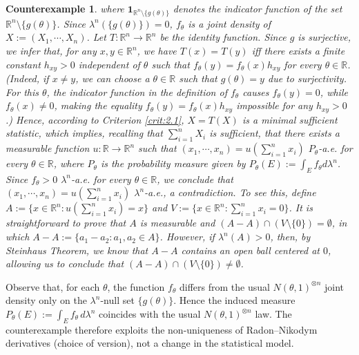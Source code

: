 \documentclass[12pt]{article}
\newtheorem{counterexample}{Counterexample}[section]
\begin{document}
\begin{counterexample}
where $\mathbf{1}_{\mathbb{R}^n\setminus \{g(\theta )\}}$ denotes the indicator function of the set $\mathbb{R}^n\setminus \{g(\theta )\}$. Since $\lambda^n(\{g(\theta )\})=0$, $f_\theta $ is a joint density of $X:=(X_1,\cdots, X_n)$. Let $T:\mathbb{R}^n\to \mathbb{R}^n$ be the identity function. Since $g$ is surjective, we infer that, for any $x,y\in\mathbb{R}^n$, we have $T(x)=T(y)$ iff there exists a finite constant $h_{xy}>0$ independent of $\theta$ such that $f_\theta (y)=f_\theta (x)h_{xy}$ for every $\theta\in\mathbb{R}$. (Indeed, if $x\neq y$, we can choose a $\theta\in\mathbb{R}$ such that $g(\theta )=y$ due to surjectivity. For this $\theta$, the indicator function in the definition of $f_\theta$ causes $f_\theta (y)=0$, while $f_\theta (x)\neq 0$, making the equality $f_\theta (y)=f_\theta (x)h_{xy}$ impossible for any $h_{xy}>0$.) Hence, according to Criterion \ref{crit:2.1}, $X=T(X)$ is a minimal sufficient statistic, which implies, recalling that $\sum _{i=1}^nX_i$ is sufficient, that there exists a measurable function $u:\mathbb{R}\to \mathbb{R}^n$ such that $(x_1,\cdots, x_n)=u(\sum _{i=1}^nx_i)$ $P_\theta$-a.e. for every $\theta\in\mathbb{R}$, where $P_\theta $ is the probability measure given by $P_\theta (E):=\int _Ef_\theta d\lambda ^n$. Since $f_\theta >0$ $\lambda ^n$-a.e. for every $\theta\in\mathbb{R}$, we conclude that $(x_1,\cdots, x_n)=u(\sum _{i=1}^nx_i)$ $\lambda ^n$-a.e., a contradiction. To see this, define $A:=\{x\in\mathbb{R}^n:u(\sum _{i=1}^nx_i)=x\}$ and $V:=\{x\in\mathbb{R}^n:\sum _{i=1}^nx_i=0\}$. It is straightforward to prove that $A$ is measurable and $(A-A)\cap (V\setminus \{0\})=\emptyset$, in which $A-A:=\{a_1-a_2:a_1,a_2\in A\}$. However, if $\lambda ^n(A)>0$, then, by Steinhaus Theorem, we know that $A-A$ contains an open ball centered at $0$, allowing us to conclude that $(A-A)\cap (V\setminus \{0\})\neq \emptyset $.
\end{counterexample}

Observe that, for each $\theta$, the function $f_\theta$ differs from the usual $N(\theta,1)^{\otimes n}$ joint density only on the $\lambda^n$-null set $\{g(\theta)\}$. Hence the induced measure $P_\theta(E):=\int_E f_\theta\, d\lambda^n$ coincides with the usual $N(\theta,1)^{\otimes n}$ law. The counterexample therefore exploits the non-uniqueness of Radon--Nikodym derivatives (choice of version), not a change in the statistical model.

   
\end{document}
